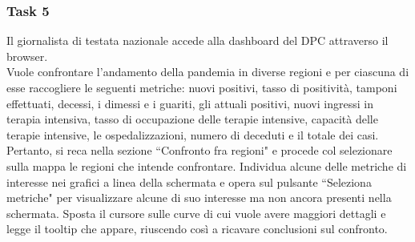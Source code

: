 
\subsubsection{Task 5}
\label{sss:cw-task-5}

Il giornalista di testata nazionale accede alla dashboard del DPC attraverso il browser.\\
Vuole confrontare l'andamento della pandemia in diverse regioni e per ciascuna di esse raccogliere le seguenti metriche: nuovi positivi, tasso di positività, tamponi effettuati, decessi, i dimessi e i guariti, gli attuali positivi, nuovi ingressi in terapia intensiva, tasso di occupazione delle terapie intensive, capacità delle terapie intensive, le ospedalizzazioni, numero di deceduti e il totale dei casi.\\
Pertanto, si reca nella sezione ``Confronto fra regioni" e procede col selezionare sulla mappa le regioni che intende confrontare.
Individua alcune delle metriche di interesse nei grafici a linea della schermata e opera sul pulsante ``Seleziona metriche" per visualizzare alcune di suo interesse ma non ancora presenti nella schermata.
Sposta il cursore sulle curve di cui vuole avere maggiori dettagli e legge il tooltip che appare, riuscendo così a ricavare conclusioni sul confronto.